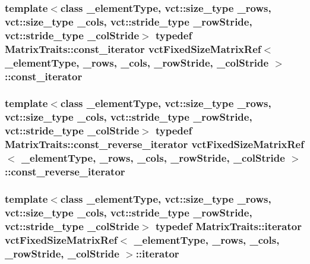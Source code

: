 \subsubsection[{const\+\_\+iterator}]{\setlength{\rightskip}{0pt plus 5cm}template$<$class \+\_\+element\+Type, vct\+::size\+\_\+type \+\_\+rows, vct\+::size\+\_\+type \+\_\+cols, vct\+::stride\+\_\+type \+\_\+row\+Stride, vct\+::stride\+\_\+type \+\_\+col\+Stride$>$ typedef {\bf Matrix\+Traits\+::const\+\_\+iterator} {\bf vct\+Fixed\+Size\+Matrix\+Ref}$<$ \+\_\+element\+Type, \+\_\+rows, \+\_\+cols, \+\_\+row\+Stride, \+\_\+col\+Stride $>$\+::{\bf const\+\_\+iterator}}\label{classvct_fixed_size_matrix_ref_a7c8a96934427f6a5a5c410abe5c0fccb}
\hypertarget{classvct_fixed_size_matrix_ref_acfd6ce4ca9ac345fc5ed261df8743c42}{}
\subsubsection[{const\+\_\+reverse\+\_\+iterator}]{\setlength{\rightskip}{0pt plus 5cm}template$<$class \+\_\+element\+Type, vct\+::size\+\_\+type \+\_\+rows, vct\+::size\+\_\+type \+\_\+cols, vct\+::stride\+\_\+type \+\_\+row\+Stride, vct\+::stride\+\_\+type \+\_\+col\+Stride$>$ typedef {\bf Matrix\+Traits\+::const\+\_\+reverse\+\_\+iterator} {\bf vct\+Fixed\+Size\+Matrix\+Ref}$<$ \+\_\+element\+Type, \+\_\+rows, \+\_\+cols, \+\_\+row\+Stride, \+\_\+col\+Stride $>$\+::{\bf const\+\_\+reverse\+\_\+iterator}}\label{classvct_fixed_size_matrix_ref_acfd6ce4ca9ac345fc5ed261df8743c42}
\hypertarget{classvct_fixed_size_matrix_ref_ab9d9f2e3e1370846c2da44b10e4ad9f8}{}
\subsubsection[{iterator}]{\setlength{\rightskip}{0pt plus 5cm}template$<$class \+\_\+element\+Type, vct\+::size\+\_\+type \+\_\+rows, vct\+::size\+\_\+type \+\_\+cols, vct\+::stride\+\_\+type \+\_\+row\+Stride, vct\+::stride\+\_\+type \+\_\+col\+Stride$>$ typedef {\bf Matrix\+Traits\+::iterator} {\bf vct\+Fixed\+Size\+Matrix\+Ref}$<$ \+\_\+element\+Type, \+\_\+rows, \+\_\+cols, \+\_\+row\+Stride, \+\_\+col\+Stride $>$\+::{\bf iterator}}\label{classvct_fixed_size_matrix_ref_ab9d9f2e3e1370846c2da44b10e4ad9f8}
\hypertarget{classvct_fixed_size_matrix_ref_a9716291cd710aec62841490659e783da}{}
